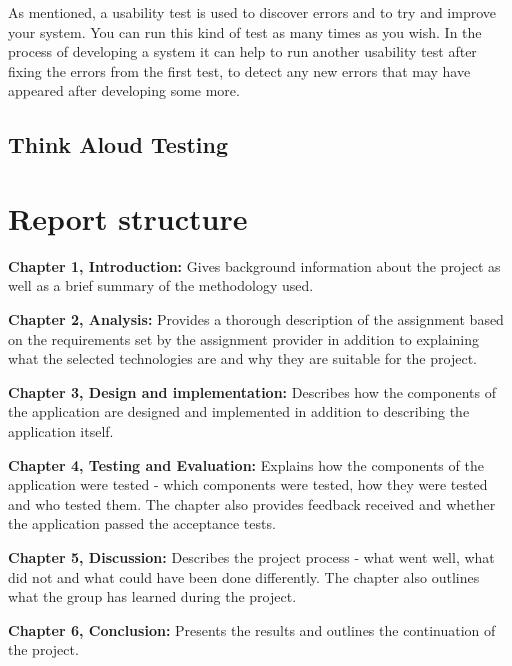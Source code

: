 As mentioned, a usability test is used to discover errors and to try and improve your system.\cite{usability-testing} You can run this kind of test as many times as you wish. In the process of developing a system it can help to run another usability test after fixing the errors from the first test, to detect any new errors that may have appeared after developing some more. %

\subsection{Think Aloud Testing}

\section{Report structure}
\textbf{Chapter 1, Introduction:}
Gives background information about the project as well as a brief summary of the methodology used.

\textbf{Chapter 2, Analysis:}
Provides a thorough description of the assignment based on the requirements set by the assignment provider in addition to explaining what the selected technologies are and why they are suitable for the project.

\textbf{Chapter 3, Design and implementation:}
Describes how the components of the application are designed and implemented in addition to describing the application itself.

\textbf{Chapter 4, Testing and Evaluation:}
Explains how the components of the application were tested - which components were tested, how they were tested and who tested them.
The chapter also provides feedback received and whether the application passed the acceptance tests.

\textbf{Chapter 5, Discussion:}
Describes the project process - what went well, what did not and what could have been done differently.
The chapter also outlines what the group has learned during the project.

\textbf{Chapter 6, Conclusion:}
Presents the results and outlines the continuation of the project.

